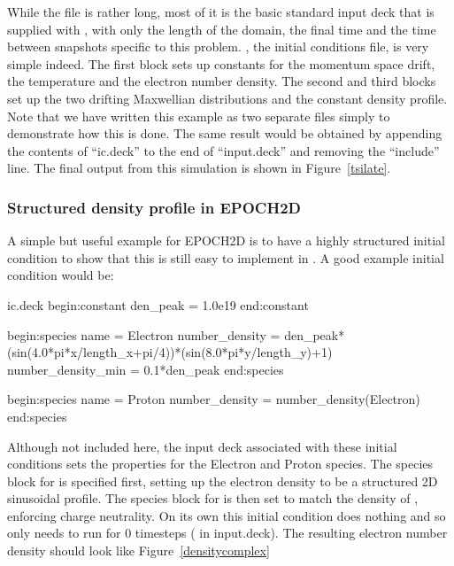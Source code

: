 
While the  file is rather long, most of it is the basic
standard input deck that is supplied with {\EPOCH}, with only the length of the
domain, the final time and the time between snapshots specific to this
problem. , the initial conditions file, is very simple
indeed. The first block sets up constants for the momentum space drift, the
temperature and the electron number density. The second and third blocks set up
the two drifting Maxwellian distributions and the constant density profile.
Note that we have written this example as two separate files simply
to demonstrate how this is done. The
same result would be obtained by appending the contents of ``ic.deck'' to
the end of ``input.deck'' and removing the ``include'' line.
The final output from this simulation is shown in Figure~\ref{tsilate}.

\subsubsection{Structured density profile in EPOCH2D}


A simple but useful example for EPOCH2D is to have a highly structured initial
condition to show that this is still easy to implement in {\EPOCH}. A good
example initial condition would be:
\begin{lboxverbatim}{ic.deck}
begin:constant
  den_peak = 1.0e19
end:constant

begin:species
  name = Electron
  number_density = den_peak*(sin(4.0*pi*x/length_x+pi/4))*(sin(8.0*pi*y/length_y)+1)
  number_density_min = 0.1*den_peak
end:species

begin:species
  name = Proton
  number_density = number_density(Electron)
end:species
\end{lboxverbatim}

Although not included here, the input deck associated with these initial
conditions sets the properties for the Electron and Proton species.
The species block for  is specified
first, setting up the electron density to be a structured 2D sinusoidal
profile. The species block for  is then set to
match the density of , enforcing charge neutrality. On
its own this initial condition does nothing and so only needs to run for 0
timesteps ( in input.deck). The resulting electron number
density should look like Figure~\ref{densitycomplex}

